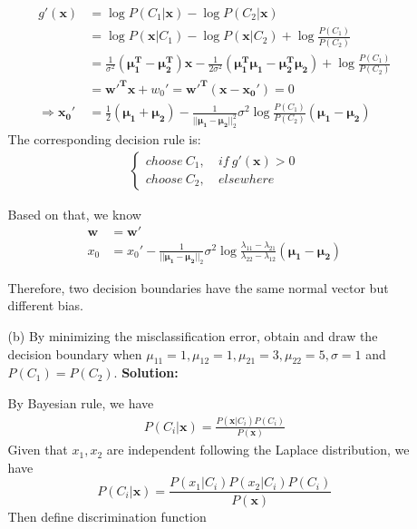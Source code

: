\documentclass{article}
\renewcommand{\b}[1]{\bm{#1}}
\begin{document}
\begin{enumerate}
\begin{enumerate}
        \begin{align*}
            g'(\b{x})&=\log{P(C_1|\b{x})}-\log{P(C_2|\b{x})}\\
            &= \log{P(\b{x}|C_1)}-\log{P(\b{x}|C_2)}+\log\frac{P(C_1)}{P(C_2)}\\
            &= \frac{1}{\sigma^2}(\b{\mu^T_1-\mu^T_2})\b{x}-\frac{1}{2\sigma^2}(\b{\mu^T_1\mu_1-\mu^T_2\mu_2})+\log\frac{P(C_1)}{P(C_2)}\\
            &= \b{w{'}^Tx} + w_0{'} = \b{w{'}^T(x-x_0{'})}=0\\
            \Rightarrow \b{x_0{'}} &= \frac{1}{2}(\b{\mu_1+\mu_2})-\frac{1}{||\b{\mu_1-\mu_2}||_2^2}\sigma^2\log{\frac{P(C_1)}{P(C_2)}}(\b{\mu_1-\mu_2})
        \end{align*}
        The corresponding decision rule is:
        \begin{align*}
            \left\{\begin{aligned}
                choose\ C_1,&\ if\ g'(\b{x})>0\\
                choose\ C_2,&\ elsewhere
            \end{aligned}\right.
        \end{align*}
        \par Based on that, we know
        \begin{align*}
            \b{w} &= \b{w{'}}\\
            x_0 &= x_0{'}-\frac{1}{||\b{\mu_1-\mu_2}||_2}\sigma^2\log{\frac{\lambda_{11}-\lambda_{21}}{\lambda_{22}-\lambda_{12}}}(\b{\mu_1-\mu_2})
        \end{align*}
        \par Therefore, two decision boundaries have the same normal vector but different bias.
        \item [(b)] By minimizing the misclassification error, obtain and draw the decision boundary when $\mu_{11}=1,\mu_{12}=1,\mu_{21}=3,\mu_{22}=5,\sigma=1$ and $P(C_1)=P(C_2)$.\newline
        {\bf Solution:}
        \par By Bayesian rule, we have
        \begin{align*}
            P(C_i|\b{x})=\frac{P(\b{x}|C_i)P(C_i)}{P(\b{x})}
        \end{align*}
        Given that $x_1, x_2$ are independent following the Laplace distribution, we have
        \[P(C_i|\b{x})=\frac{P(x_1|C_i)P(x_2|C_i)P(C_i)}{P(\b{x})}\]
        Then define discrimination function 
        \begin{align*}

\end{align*}
\end{enumerate}
\end{enumerate}
\end{document}
